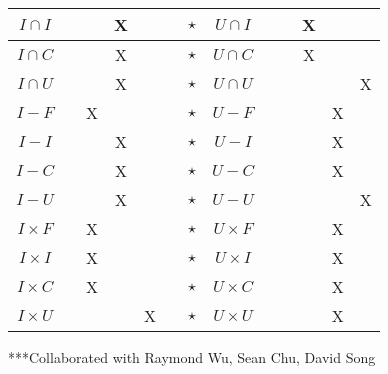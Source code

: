 \documentclass[11pt]{article}
\begin{document}
\begin{center}
\begin{tabular}{c|c|c|c|c|c|c|c|c|c|c|c|c}
$I \cap I$ & & & X & & & $\star$ & $U \cap I$ & & & X & & \\ \hline
$I \cap C$ & & & X & & & $\star$ & $U \cap C$ & & & X & & \\ \hline
$I \cap U$ & & & X & & & $\star$ & $U \cap U$ & & & & & X\\ \hline
$I - F$ & & X & & & & $\star$ & $U - F$ & & & & X & \\ \hline
$I - I$ & & & X & & & $\star$ & $U - I$ & & & & X & \\ \hline
$I - C$ & & & X & & & $\star$ & $U - C$ & & & & X & \\ \hline
$I - U$ & & & X & & & $\star$ & $U - U$ & & & & & X \\ \hline
$I \times F$ & & X & & & & $\star$ & $U \times F$ & & & & X & \\ \hline
$I \times I$ & & X & & & & $\star$ & $U \times I$ & & & & X & \\ \hline
$I \times C$ & & X & & & & $\star$ & $U \times C$ & & & & X & \\ \hline
$I \times U$ & & & & X & & $\star$ & $U \times U$ & & & & X & \\ \hline



	\end{tabular}
\end{center}

***Collaborated with Raymond Wu, Sean Chu, David Song
\end{document}

